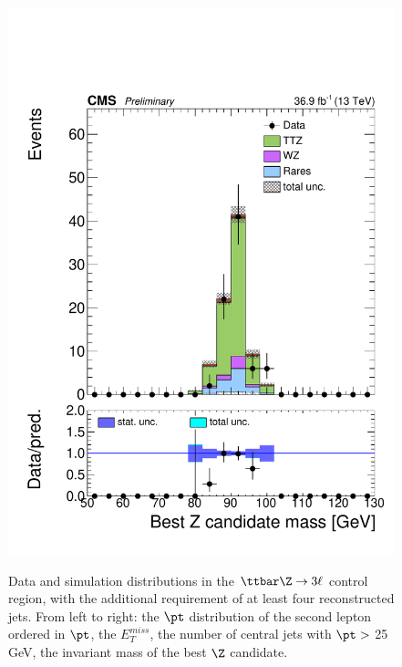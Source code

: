 \begin{figure}[!htb]
\includegraphics[width=0.35\linewidth]{plots_controlregions/cr_ttz_data_frdata_4j/mZ1.pdf}\\
\caption{Data and simulation distributions in the $\ttbar\Z\to3\ell$
control region, with the additional requirement of at least four reconstructed jets.
From left to right: the $\pt$ distribution of the
second lepton ordered in $\pt$, the $E_{T}^{miss}$, the number of
central jets with $\pt >$ 25 GeV, the invariant mass of the best $\Z$ candidate.}  
\label{fig:cr_ttZ3l4j}
\end{figure}



\clearpage

   




